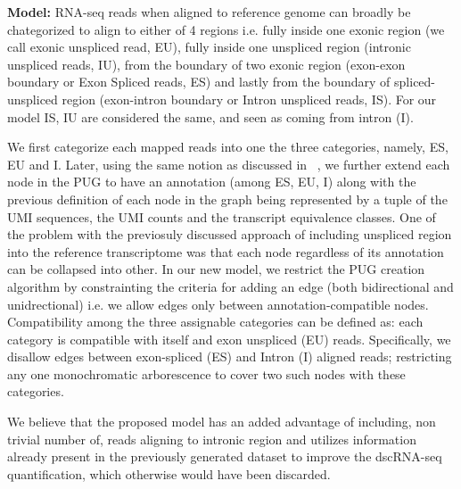 \textbf{Model:} RNA-seq reads when aligned to reference genome can broadly be chategorized to 
align to either of 4 regions i.e. fully inside one exonic region (we call exonic unspliced read, EU), 
fully inside one unspliced region (intronic unspliced reads, IU),  from the boundary of two
exonic region (exon-exon boundary or Exon Spliced reads, ES) and lastly from the boundary of 
spliced-unspliced region (exon-intron boundary or Intron unspliced reads, IS). For our
model IS, IU are considered the same, and seen as coming from intron (I).

We first categorize each mapped reads into one the three categories, namely, ES, EU and I.
Later, using the same notion as discussed in ~, we further extend each node in the PUG 
to have an annotation (among ES, EU, I) along with the previous definition of each node in the graph
being represented by a tuple of the UMI sequences, the UMI counts and the transcript 
equivalence classes. One of the problem with the previosuly discussed \naive approach of including 
unspliced region into the reference transcriptome was that each node regardless of its annotation 
can be collapsed into other. In our new model, we restrict the PUG creation algorithm by constrainting 
the criteria for adding an edge (both bidirectional and unidrectional) i.e. we allow edges only between
annotation-compatible nodes. Compatibility among the three assignable categories can be defined as:
each category is compatible with itself and exon unspliced (EU) reads. Specifically, we disallow
edges between exon-spliced (ES) and Intron (I) aligned reads; restricting any one monochromatic
arborescence to cover two such nodes with these categories.

We believe that the proposed model has an added advantage of including, non trivial number of, reads
aligning to intronic region and utilizes information already present in the previously generated
dataset to improve the dscRNA-seq quantification, which otherwise would have been discarded.


























